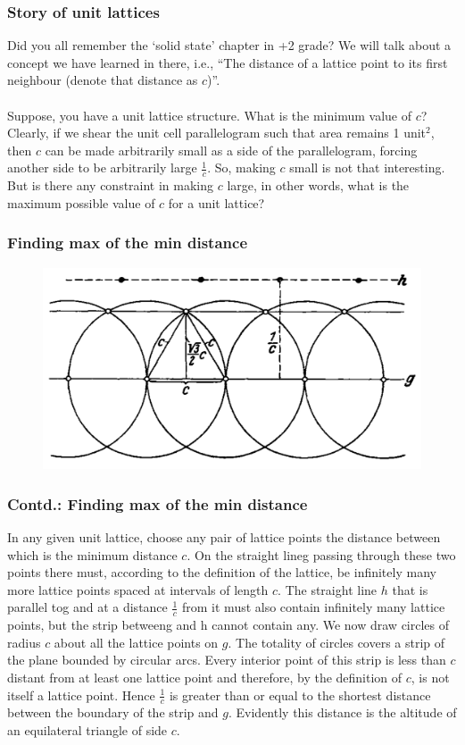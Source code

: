\documentclass{beamer}
\begin{document}
    \begin{frame}
        \frametitle{Story of unit lattices}
        Did you all remember the `solid state' chapter in +2 grade? We will talk about a concept we have learned in there, i.e., ``The distance of a lattice point to its first neighbour (denote that distance as \(c\))''. \\~\\

        Suppose, you have a unit lattice structure. What is the minimum value of \(c\)? Clearly, if we shear the unit cell parallelogram such that area remains 1 unit\(^2\), then \(c\) can be made arbitrarily small as a side of the parallelogram, forcing another side to be arbitrarily large \(\frac{1}{c}\). So, making \(c\) small is not that interesting. But is there any constraint in making \(c\) large, in other words, what is the maximum possible value of \(c\) for a unit lattice?
    \end{frame}

    \begin{frame}
        \frametitle{Finding max of the min distance}
        \begin{figure}
            \includegraphics[scale=0.45]{dist.png}
        \end{figure}
    \end{frame}

    \begin{frame}
        \frametitle{Contd.: Finding max of the min distance}
        In any given unit lattice, choose any pair of lattice points the distance between which is the minimum distance \(c\). On the straight lineg passing through these two points there must, according to the definition of the lattice, be infinitely many more lattice points spaced at intervals of length \(c\). The straight line \(h\) that is parallel tog and at a distance \(\frac{1}{c}\) from it must also contain infinitely many lattice points, but the strip betweeng and h cannot contain any. We now draw circles of radius \(c\) about all the lattice points on \(g\). The totality of circles covers a strip of the plane bounded by circular arcs. Every interior point of this strip is less than \(c\) distant from at least one lattice point and therefore, by the definition of \(c\), is not itself a lattice point. Hence \(\frac{1}{c}\) is greater than or equal to the shortest distance between the boundary of the strip and \(g\). Evidently this distance is the altitude of an equilateral triangle of side \(c\).
    \end{frame}
\end{document}
